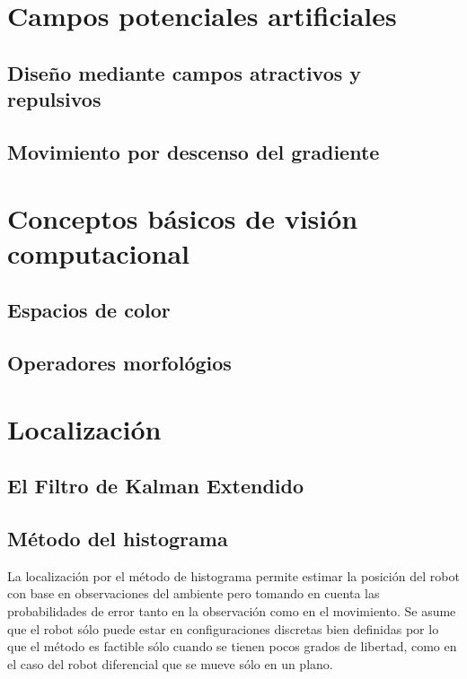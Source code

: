 \documentclass[letterpaper,12pt]{article}
\begin{document}
\section{Campos potenciales artificiales}

\subsection{Diseño mediante campos atractivos y repulsivos}

\subsection{Movimiento por descenso del gradiente}

\section{Conceptos básicos de visión computacional}

\subsection{Espacios de color}

\subsection{Operadores morfológios}


\section{Localización}

\subsection{El Filtro de Kalman Extendido}

\subsection{Método del histograma}
La localización por el método de histograma permite estimar la posición del robot con base en observaciones del ambiente pero tomando en cuenta las probabilidades de error tanto en la observación como en el movimiento. Se asume que el robot sólo puede estar en configuraciones discretas bien definidas por lo que el método es factible sólo cuando se tienen pocos grados de libertad, como en el caso del robot diferencial que se mueve sólo en un plano. 
\end{document}
